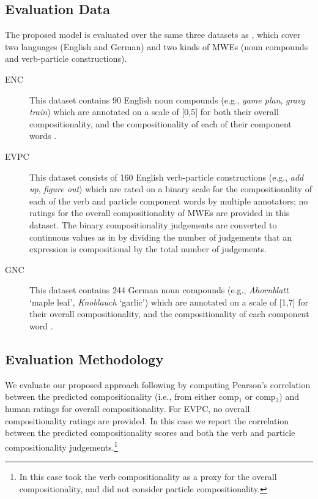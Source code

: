 \documentclass[11pt]{article}
\newcommand{\compone}{comp$_1$\xspace}
\newcommand{\comptwo}{comp$_2$\xspace}
\begin{document}

\subsection{Evaluation Data}

The proposed model is evaluated over the same three datasets as
\cite{Salehi+:2015}, which cover two languages (English and German)
and two kinds of MWEs (noun compounds and verb-particle
constructions).

\begin{description}
  \item[ENC] This dataset contains 90 English noun compounds (e.g.,
    \emph{game plan}, \emph{gravy train}) which are annotated on a
    scale of [0,5] for both their overall compositionality, and the
    compositionality of each of their component words
    \citep{reddy2011empirical}.

  \item[EVPC] This dataset consists of 160 English verb-particle
    constructions (e.g., \emph{add up}, \emph{figure out}) which are
    rated on a binary scale for the compositionality of each of the
    verb and particle component words \citep{bannard2006acquiring} by
    multiple annotators; no ratings for the overall compositionality
    of MWEs are provided in this dataset. The binary compositionality
    judgements are converted to continuous values as in
    \cite{Salehi+:2015} by dividing the number of judgements that an
    expression is compositional by the total number of judgements.

  \item[GNC] This dataset contains 244 German noun compounds (e.g.,
    \emph{Ahornblatt} `maple leaf', \emph{Knoblauch} `garlic') which
    are annotated on a scale of [1,7] for their overall
    compositionality, and the compositionality of each component word
    \citep{von2009assoziationen}.
\end{description}

\subsection{Evaluation Methodology}

We evaluate our proposed approach following \cite{Salehi+:2015} by
computing Pearson's correlation between the predicted compositionality
(i.e., from either \compone or \comptwo) and human ratings for overall
compositionality. For EVPC, no overall compositionality ratings are
provided. In this case we report the correlation between the predicted
compositionality scores and both the verb and particle
compositionality judgements.\footnote{In this case
  \cite{Salehi+:2015} took the verb compositionality as a proxy for
  the overall compositionality, and did not consider particle
  compositionality.}
\end{document}
